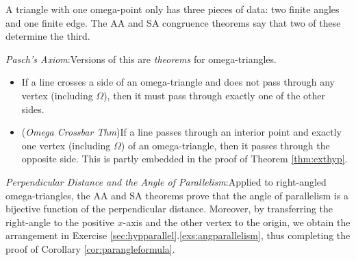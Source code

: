 A triangle with one omega-point only has three pieces of data: two finite angles and one finite edge. The AA and SA congruence theorems say that two of these determine the third.


\emph{Pasch's Axiom}:\quad Versions of this are \emph{theorems} for omega-triangles.
\begin{itemize}
  \item If a line crosses a side of an omega-triangle and does not pass through any vertex (including $\Omega$), then it must pass through exactly one of the other sides.
  \item (\emph{Omega Crossbar Thm})\lstsp If a line passes through an interior point and exactly one vertex (including $\Omega$) of an omega-triangle, then it passes through the opposite side. This is partly embedded in the proof of Theorem \ref{thm:exthyp}.
\end{itemize}


\emph{Perpendicular Distance and the Angle of Parallelism}:\quad Applied to right-angled omega-triangles, the AA and SA theorems prove that the angle of parallelism is a bijective function of the perpendicular distance. Moreover, by transferring the right-angle to the positive $x$-axis and the other vertex to the origin, we obtain the arrangement in Exercise \ref*{sec:hypparallel}.\ref{exs:angparallelism}, thus completing the proof of Corollary \ref{cor:parangleformula}.


% 



